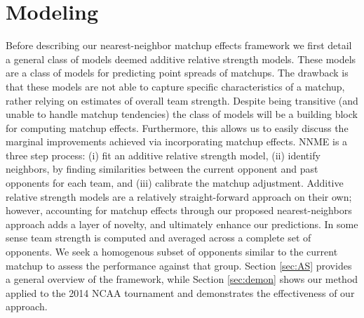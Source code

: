 \documentclass[letterpaper,12pt]{article}
\begin{document}
\section{Modeling\label{sec:NNME}}
Before describing our nearest-neighbor matchup effects framework we first detail a general class of models deemed additive relative strength models. These models are a class of models for predicting point spreads of matchups. The drawback is that these models are not able to capture specific characteristics of a matchup, rather relying on estimates of overall team strength. Despite being transitive (and unable to handle matchup tendencies) the class of models will be a building block for computing matchup effects. Furthermore, this allows us to easily discuss the marginal improvements achieved via incorporating matchup effects. NNME is a three step process: (i) fit an additive relative strength model, (ii) identify neighbors, by finding similarities between the current opponent and past opponents for each team, and (iii) calibrate the matchup adjustment. Additive relative strength models are a relatively straight-forward approach on their own; however, accounting for matchup effects through our proposed nearest-neighbors approach adds a layer of novelty, and ultimately enhance our predictions. In some sense team strength is computed and averaged across a complete set of opponents. We seek a homogenous subset of opponents similar to the current matchup to assess the performance against that group. Section \ref{sec:AS} provides a general overview of the framework, while Section \ref{sec:demon} shows our method applied to the 2014 NCAA tournament and demonstrates the effectiveness of our approach.
\end{document}
